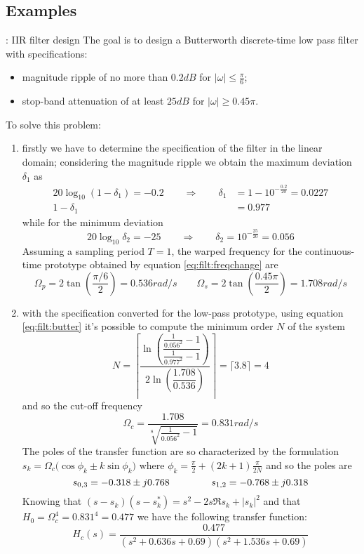 	\subsection{Examples}
		\begin{example}{: IIR filter design}
			The goal is to design a Butterworth discrete-time low pass filter with specifications:
			\begin{itemize}
				\item magnitude ripple of no more than $0.2dB$ for $|\omega|\leq \frac \pi 6$;
				\item stop-band attenuation of at least $25dB$ for $|\omega| \geq 0.45\pi$.
			\end{itemize}
			To solve this problem:
			\begin{enumerate}
				\item firstly we have to determine the specification of the filter in the linear domain; considering the magnitude ripple we obtain the maximum deviation $\delta_1$ as
				\begin{align*}
					20 \log_{10}(1-\delta_1) = -0.2 \qquad \Rightarrow \qquad \delta_1 & = 1 - 10^{-\frac{0.2}{20}} = 0.0227 \\
					1-\delta_1 &= 0.977
				\end{align*}
				while for the minimum deviation
				\[ 20\log_{10}\delta_2 = - 25 \qquad \Rightarrow \qquad \delta_2 = 10^{-\frac{25}{20}} = 0.056 \]
				Assuming a sampling period $T=1$, the warped frequency for the continuous-time prototype obtained by equation \ref{eq:filt:freqchange} are
				\[ \Omega_p = 2 \tan\left( \frac{\pi/6}2 \right) = 0.536 rad/s \qquad \Omega_s = 2 \tan\left( \frac{0.45\pi}{2} \right) = 1.708 rad/s  \]
				
				\item with the specification converted for the low-pass prototype, using equation \ref{eq:filt:butter} it's possible to compute the minimum order $N$ of the system 
				\[ N = \left\lceil \frac{\ln \left( \dfrac{ \frac 1 {0.056^2} -1 }{\frac{1}{0.977^2}-1} \right)}{2 \ln \left(\dfrac{1.708}{0.536}\right)} \right\rceil = \big\lceil   3.8 \big\rceil = 4\]
				and so the cut-off frequency
				\[ \Omega_c = \frac{1.708}{\sqrt[8]{\frac{1}{0.056^2}-1}} = 0.831 rad/s \]
				The poles of the transfer function are so characterized by the formulation $s_k = \Omega_c\big(\cos\phi_k \pm k \sin\phi_k\big)$ where $\phi_k = \frac \pi 2 + (2k+1)\frac{\pi}{2N}$ and so the poles are
				\[ s_{0,3} = -0.318 \pm j0.768 \hspace{1.5cm} s_{1,2} = -0.768 \pm j 0.318 \]
				Knowing that $(s-s_k)(s-s_k^*) = s^2 -2s\Re{s_k} + |s_k|^2$ and that $H_0 = \Omega_c^4 = 0.831^4 = 0.477$ we have the following transfer function:
				\[ H_c(s) = \frac{0.477}{(s^2 + 0.636s +0.69)(s^2 + 1.536s + 0.69)} \]
				

\end{enumerate}
\end{example}

